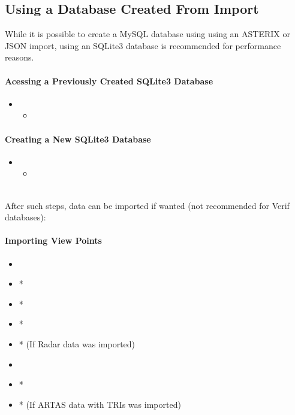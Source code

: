 \subsection{Using a Database Created From Import}

While it is possible to create a MySQL database using using an ASTERIX or JSON import, using an SQLite3 database is recommended for performance reasons.

\paragraph{Acessing a Previously Created SQLite3 Database} 

\begin{itemize}
\item {}
\begin{itemize}
 \item {}
 \end{itemize}
 \end{itemize}

\paragraph{Creating a New SQLite3 Database}

\begin{itemize}
\item {}
\begin{itemize}
 \item {}
\end{itemize}
\end{itemize}
\ \\

After such steps, data can be imported if wanted (not recommended for Verif databases):

\paragraph{Importing View Points} 

\begin{itemize}
 \item {}
 \item {}*
 \item {}*
 \item {}*
 \item {}* (If Radar data was imported)
 \item {}
 \item {}*
 \item {}* (If ARTAS data with TRIs was imported)
\end{itemize}


